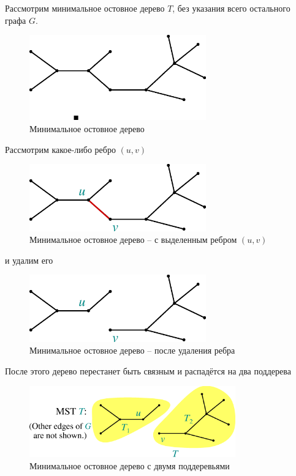 \documentclass[a4paper,11pt]{article}
\begin{document}
Рассмотрим минимальное остовное дерево $T$, без указания всего остального графа
$G$.

\begin{figure}[ht]
  \centering
  \includegraphics[width=3in]{lecture16/mst1.eps}
  \caption{Минимальное остовное дерево}
  \label{fig:mst1}
\end{figure}

Рассмотрим какое-либо ребро $(u, v)$ 

\begin{figure}[ht]
  \centering
  \includegraphics[width=3in]{lecture16/mst2.eps}
  \caption{Минимальное остовное дерево -- с выделенным ребром $(u, v)$}
  \label{fig:mst2}
\end{figure}

и удалим его

\begin{figure}[ht]
  \centering
  \includegraphics[width=3in]{lecture16/mst3.eps}
  \caption{Минимальное остовное дерево -- после удаления ребра}
  \label{fig:mst3}
\end{figure}

После этого дерево перестанет быть связным и распадётся на два поддерева

\begin{figure}[ht]
  \centering
  \includegraphics[width=3.5in]{lecture16/mst4.eps}
  \caption{Минимальное остовное дерево с двумя поддеревьями}
  \label{fig:mst4}
\end{figure}
\end{document}
